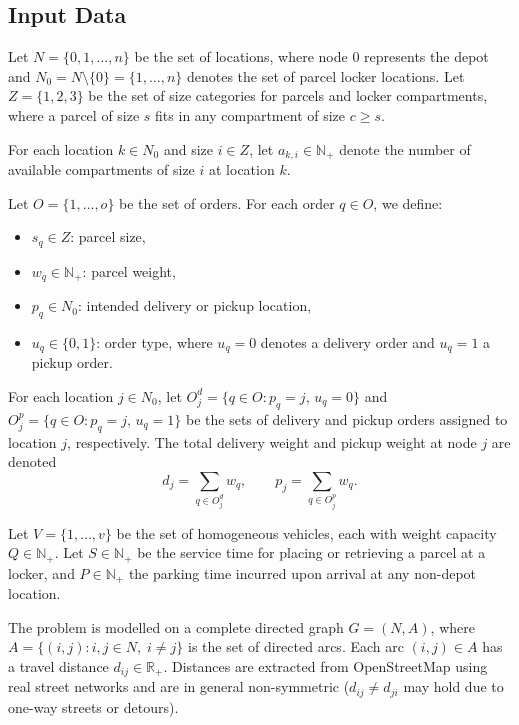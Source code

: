 
\subsection{Input Data}

Let $N = \{0, 1, \ldots, n\}$ be the set of locations, where node $0$ represents
the depot and $N_0 = N \setminus \{0\} = \{1, \ldots, n\}$ denotes the set of
parcel locker locations. Let $Z = \{1, 2, 3\}$ be the set of size categories for
parcels and locker compartments, where a parcel of size $s$ fits in any
compartment of size $c \geq s$.

For each location $k \in N_0$ and size $i \in Z$, let $a_{k,i} \in \mathbb{N}_+$
denote the number of available compartments of size $i$ at location $k$.

Let $O = \{1, \ldots, o\}$ be the set of orders. For each order $q \in O$, we
define:
\begin{itemize}
    \item $s_q \in Z$: parcel size,
    \item $w_q \in \mathbb{N}_+$: parcel weight,
    \item $p_q \in N_0$: intended delivery or pickup location,
    \item $u_q \in \{0, 1\}$: order type, where $u_q = 0$ denotes a delivery order
    and $u_q = 1$ a pickup order.
\end{itemize}
For each location $j \in N_0$, let $O_j^d = \{q \in O : p_q = j,\, u_q = 0\}$
and $O_j^p = \{q \in O : p_q = j,\, u_q = 1\}$ be the sets of delivery and
pickup orders assigned to location $j$, respectively. The total delivery weight
and pickup weight at node $j$ are denoted
\[
    d_j = \sum_{q \in O_j^d} w_q, \qquad
    p_j = \sum_{q \in O_j^p} w_q.
\]

Let $V = \{1, \ldots, v\}$ be the set of homogeneous vehicles, each with weight
capacity $Q \in \mathbb{N}_+$. Let $S \in \mathbb{N}_+$ be the service time for
placing or retrieving a parcel at a locker, and $P \in \mathbb{N}_+$ the parking
time incurred upon arrival at any non-depot location.

The problem is modelled on a complete directed graph $G = (N, A)$, where
$A = \{(i, j) : i, j \in N,\; i \neq j\}$ is the set of directed arcs. Each arc
$(i, j) \in A$ has a travel distance $d_{ij} \in \mathbb{R}_+$. Distances are
extracted from OpenStreetMap using real street networks and are in general
non-symmetric ($d_{ij} \neq d_{ji}$ may hold due to one-way streets or
detours).

